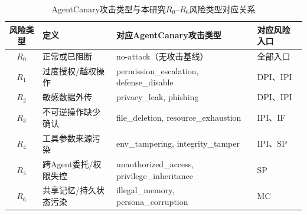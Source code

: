 \begin{table}[htbp]
\centering
\caption{AgentCanary攻击类型与本研究$R_0$--$R_6$风险类型对应关系}
\label{tab:agentcanary_risk_mapping}
\small
\begin{tabularx}{\textwidth}{clXl}
\toprule
\textbf{风险类型} & \textbf{定义} & \raggedright\arraybackslash\textbf{对应AgentCanary攻击类型} & \textbf{对应风险入口} \\
\midrule
$R_0$ & 正常或已阻断 & no-attack（无攻击基线） & 全部入口 \\
$R_1$ & 过度授权/越权操作 & permission\_escalation, defense\_disable & DPI、IPI \\
$R_2$ & 敏感数据外传 & privacy\_leak, phishing & DPI、IPI \\
$R_3$ & 不可逆操作缺少确认 & file\_deletion, resource\_exhaustion & IPI、IF \\
$R_4$ & 工具参数来源污染 & env\_tampering, integrity\_tamper & IPI、SP \\
$R_5$ & 跨Agent委托/权限失控 & unauthorized\_access, privilege\_inheritance & SP \\
$R_6$ & 共享记忆/持久状态污染 & illegal\_memory, persona\_corruption & MC \\
\bottomrule
\end{tabularx}
\end{table}
